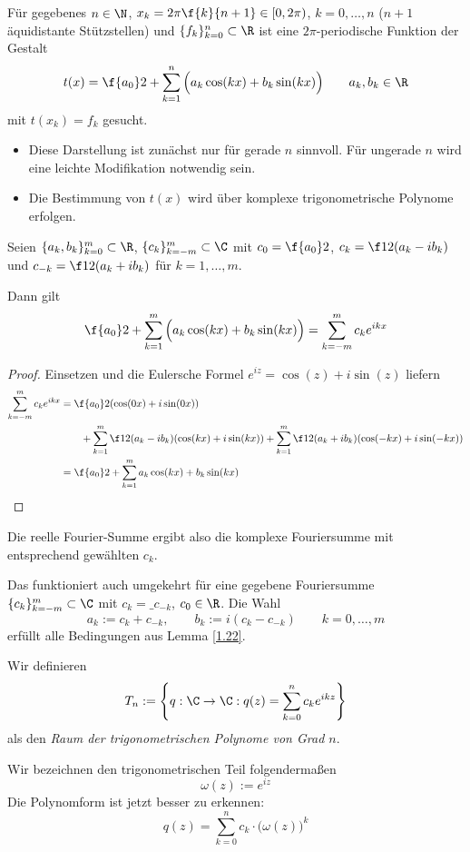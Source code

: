 \documentclass[11pt]{scrbook}
\begin{document}
Für gegebenes $n\in \N$, $x_k = 2\pi \f {k}{n+1} \in [0,2\pi)$, $k=0,\dotsc,n$ ($n+1$ äquidistante Stützstellen) und $\{f_k\}_{k=0}^n\subset \R$ ist eine $2\pi$-periodische Funktion der Gestalt
\[
	t(x) = \f {a_0}2 + \sum_{k=1}^n \Big(a_k \cos(kx) + b_k \sin(kx) \Big) \qquad a_k,b_k \in \R
\]
mit $t(x_k)=f_k$ gesucht.

\begin{note}
	\begin{itemize}
		\item
			Diese Darstellung ist zunächst nur für gerade $n$ sinnvoll.
			Für ungerade $n$ wird eine leichte Modifikation notwendig sein.
		\item
			Die Bestimmung von $t(x)$ wird über komplexe trigonometrische Polynome erfolgen.
	\end{itemize}
\end{note}

\begin{lem}
	\label{1.22}
	Seien $\{a_k,b_k\}_{k=0}^m\subset \R$, $\{c_k\}_{k=-m}^m\subset \C$ mit $c_0=\f {a_0}2$, $c_k=\f 12(a_k-ib_k)$ und $c_{-k}=\f 12(a_k+ib_k)$ für $k=1,\dotsc, m$.

	Dann gilt
	\[
		\f {a_0}2 + \sum_{k=1}^m \Big(a_k\cos(kx) + b_k\sin(kx)\Big) = \sum_{k=-m}^m c_k e^{ikx}
	\]
	\begin{proof}
		Einsetzen und die Eulersche Formel $e^{iz}=\cos(z) +i\sin(z)$ liefern
		\begin{align*}
			\sum_{k=-m}^m c_ke^{ikx} &= \f {a_0}2 (\cos(0x) + i\sin(0x)) \\
			& \qquad + \sum_{k=1}^m \f 12 (a_k-ib_k)(\cos(kx) +i\sin(kx)) + \sum_{k=1}^m \f 12 (a_k+ib_k)(\cos(-kx)+i\sin(-kx)) \\
			&= \f {a_0}2 + \sum_{k=1}^m a_k\cos(kx) + b_k \sin(kx)
		\end{align*}
	\end{proof}
	\begin{note}
			Die reelle Fourier-Summe ergibt also die komplexe Fouriersumme mit entsprechend gewählten $c_k$.

			Das funktioniert auch umgekehrt für eine gegebene Fouriersumme $\{c_k\}_{k=-m}^m\subset \C$ mit $c_k=\_{c_{-k}}$, $c_0\in \R$.
			Die Wahl
			\[
				a_k := c_k +c_{-k}, \qquad b_k := i(c_k-c_{-k}) \qquad k=0,\dotsc,m
			\]
			erfüllt alle Bedingungen aus Lemma \ref{1.22}.
	\end{note}
\end{lem}

\begin{df} \label{1.23}
	Wir definieren
	\[
		T_n := \left\{ q: \C \to\C : q(z) = \sum_{k=0}^n c_k e^{ikz}\right\}
	\]
	als den \emph{Raum der trigonometrischen Polynome von Grad $n$}.
	\begin{note}
		Wir bezeichnen den trigonometrischen Teil folgendermaßen
		\[
			\omega(z) := e^{iz}
		\]
		Die Polynomform ist jetzt besser zu erkennen:
		\[
			q(z) = \sum_{k=0}^n c_k\cdot \big(\omega(z)\big)^k
		\]
	\end{note}
\end{df}
\end{document}
